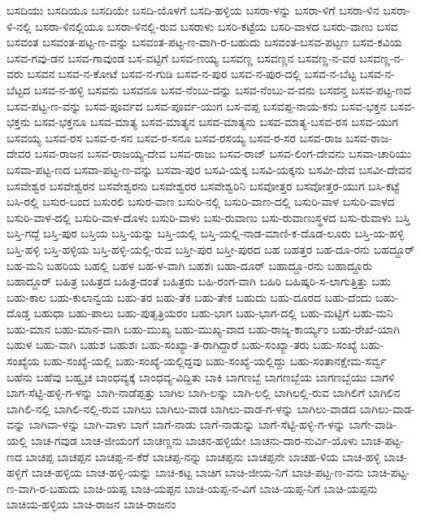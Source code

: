 ಬಸದಿಯು
ಬಸದಿಯೂ
ಬಸದಿಯೇ
ಬಸದಿ-ಯೊಳಗೆ
ಬಸದಿ-ಹಳ್ಳಿಯ
ಬಸರಾ-ಳನ್ನು
ಬಸರಾ-ಳಿಗೆ
ಬಸರಾ-ಳಿನ
ಬಸರಾ-ಳಿ-ನಲ್ಲಿ
ಬಸರಾ-ಳಿನಲ್ಲಿಯೂ
ಬಸರಾ-ಳಿನಲ್ಲಿ-ರುವ
ಬಸರಾಳು
ಬಸರಿ-ಕಟ್ಟೆಯ
ಬಸರಿ-ವಾಳದ
ಬಸರು-ವಾಣು
ಬಸವ
ಬಸವಂತ
ಬಸವಂತ-ಪಟ್ಟ-ಣ-ವನ್ನು
ಬಸವಂತ-ಪಟ್ಟ-ಣ-ವಾಗಿ-ರ-ಬಹುದು
ಬಸವಂತ-ಬಸವ-ಪಟ್ಟಣ
ಬಸವ-ಕವಿಯ
ಬಸವ-ಗವು-ಡನ
ಬಸವ-ಗಾವುಂಡ
ಬಸ-ವಟ್ಟಿಗೆ
ಬಸವ-ಣಯ್ಯ
ಬಸವಣ್ಣ
ಬಸವಣ್ಣನ
ಬಸವಣ್ಣ-ನ-ವರ
ಬಸವಣ್ಣ-ನ-ವರು
ಬಸವನ
ಬಸವ-ನ-ಕೋಟೆ
ಬಸವ-ನ-ಗುಡಿ
ಬಸವ-ನ-ಪುರ
ಬಸವ-ನ-ಪುರ-ದಲ್ಲಿ
ಬಸವ-ನ-ಬೆಟ್ಟ
ಬಸವ-ನ-ಬೆಟ್ಟದ
ಬಸವ-ನ-ಹಳ್ಳಿ
ಬಸವನು
ಬಸವನೂ
ಬಸವ-ನೆಂಬು-ದನ್ನು
ಬಸವ-ನೆಂಬು-ವ-ವನು
ಬಸವನ್ತ
ಬಸವ-ಪಟ್ಟ-ಣದ
ಬಸವ-ಪಟ್ಟ-ಣ-ವನ್ನು
ಬಸವ-ಪೂರ್ವದ
ಬಸವ-ಪೂರ್ವ-ಯುಗ
ಬಸ-ವಪ್ಪ
ಬಸವಪ್ಪ-ನಾಯ-ಕನು
ಬಸವ-ಭಕ್ತನ
ಬಸವ-ಭಕ್ತನು
ಬಸವ-ಭಕ್ತನೂ
ಬಸವ-ಮಾತ್ಯ
ಬಸವ-ಮಾತ್ಯನ
ಬಸವ-ಮಾತ್ಯನು
ಬಸವ-ಮಾತ್ಯ-ಬಸವ-ರಸ
ಬಸವ-ಯುಗ
ಬಸವಯ್ಯ
ಬಸವ-ರಸ
ಬಸವ-ರ-ಸನ
ಬಸವ-ರ-ಸನೂ
ಬಸವ-ರಸಯ್ಯ
ಬಸವ-ರ-ಸರ
ಬಸವ-ರಾಜ
ಬಸವ-ರಾಜ-ದೇವರ
ಬಸವ-ರಾಜನ
ಬಸವ-ರಾಜಯ್ಯ-ದೇವ
ಬಸವ-ರಾಜು
ಬಸವ-ರಾಜ್
ಬಸವ-ಲಿಂಗ-ದೇವನು
ಬಸವಾ-ಚಾರಿಯು
ಬಸವಾ-ಪಟ್ಟ-ಣದ
ಬಸವಾ-ಪಟ್ಟ-ಣ-ವನ್ನು
ಬಸವಾ-ಪುರ
ಬಸವಿ-ಯಕ್ಕ
ಬಸವಿ-ಯಕ್ಕನು
ಬಸವೀ-ದೇವ
ಬಸವೀ-ದೇವನ
ಬಸವೇಶ್ವರ
ಬಸವೇಶ್ವರನ
ಬಸವೇಶ್ವರನು
ಬಸವೇಶ್ವರರ
ಬಸವೇಶ್ವರಿನಿ
ಬಸವೋತ್ತರ
ಬಸವೋತ್ತರ-ಯುಗ
ಬಸಿ-ಕಟ್ಟೆ
ಬಸಿ-ರಲ್ಲಿ
ಬಸುರ-ಬಂದ
ಬಸುರಲಿ
ಬಸುರ-ವಾಣ
ಬಸುರಿ-ನಲ್ಲಿ
ಬಸುರಿ-ವಾಣ-ದಲ್ಲಿ
ಬಸುರಿ-ವಾಳ
ಬಸುರಿ-ವಾಳದ
ಬಸುರಿ-ವಾಳ-ದಲ್ಲಿ
ಬಸುರಿ-ವಾಳ-ದೊಳು
ಬಸುರಿ-ವಾಳು
ಬಸು-ರುವಾಣು
ಬಸು-ರುವಾಣುಸ್ಥಳದ
ಬಸು-ರುವಾಳು
ಬಸ್ತಿ
ಬಸ್ತಿ-ಗದ್ದೆ
ಬಸ್ತಿ-ಪುರ
ಬಸ್ತಿಯ
ಬಸ್ತಿ-ಯನ್ನು
ಬಸ್ತಿ-ಯಲ್ಲಿ
ಬಸ್ತಿ-ಯಲ್ಲಿ-ನಾಡ-ಮಾಣಿ-ಕ-ದೊಡ-ಲೂರು
ಬಸ್ತಿ-ಯ-ಹಳ್ಳಿ
ಬಸ್ತಿ-ಹಳ್ಳಿ
ಬಸ್ತಿ-ಹಳ್ಳಿಯ
ಬಸ್ತಿ-ಹಳ್ಳಿ-ಯಲ್ಲಿ-ರುವ
ಬಸ್ತೀ-ಪುರ
ಬಸ್ತೀ-ಪುರದ
ಬಹ
ಬಹತ್ತರ
ಬಹ-ದೂ-ರನು
ಬಹದ್ದೂರ್
ಬಹ-ಮನಿ
ಬಹರಿಯ
ಬಹಲ್ಲಿ
ಬಹಳ
ಬಹ-ಳ-ವಾಗಿ
ಬಹಶಃ
ಬಹಾ-ದೂರ್
ಬಹಾದ್ದೂ-ರನು
ಬಹಾದ್ದೂರು
ಬಹಾದ್ದೂರ್
ಬಹಿತ್ರ
ಬಹಿತ್ರದ
ಬಹಿತ್ರ-ದಂತೆ
ಬಹಿತ್ರರು
ಬಹಿ-ರಂಗ-ವಾಗಿ
ಬಹಿರಿ
ಬಹಿಷ್ಕರಿ-ಸ-ಲಾಗುತ್ತಿತ್ತು
ಬಹು
ಬಹು-ಕಾಲ
ಬಹು-ಕುಲಾನ್ವಯ
ಬಹು-ತರ
ಬಹು-ತೆಕ
ಬಹು-ತೇಕ
ಬಹುದು
ಬಹು-ದೂರದ
ಬಹು-ದೆಂದು
ಬಹು-ದೊಡ್ಡ
ಬಹುಧಾ
ಬಹು-ಪಾಲು
ಬಹು-ಪುತೃತ್ರಿಯರಂ
ಬಹು-ಭಾಗ
ಬಹು-ಭಾಗ-ದಲ್ಲಿ
ಬಹು-ಮಟ್ಟಿಗೆ
ಬಹು-ಮನಿ
ಬಹು-ಮಾನ
ಬಹು-ಮಾನ-ವಾಗಿ
ಬಹು-ಮುಖ್ಯ
ಬಹು-ಮುಖ್ಯ-ವಾದ
ಬಹು-ರಾಜ್ಯ-ಕಾರ್ಯ್ಯಂ
ಬಹು-ರೇಖೆ-ಯಾಗಿ
ಬಹುಳ
ಬಹು-ವಾಗಿ
ಬಹುಶ
ಬಹುಶಃ
ಬಹು-ಸಂಖ್ಯಾ-ತ-ರಾಗಿದ್ದಾರೆ
ಬಹು-ಸಂಖ್ಯಾ-ತರು
ಬಹು-ಸಂಖ್ಯೆ
ಬಹು-ಸಂಖ್ಯೆಯ
ಬಹು-ಸಂಖ್ಯೆ-ಯಲ್ಲಿ
ಬಹು-ಸಂಖ್ಯೆ-ಯಲ್ಲಿದ್ದವು
ಬಹು-ಸಂಖ್ಯೆ-ಯಲ್ಲಿದ್ದು
ಬಹು-ಸಂತಾನಕ್ಷೇಮ-ಸರ್ವ್ವ
ಬಹೆನು
ಬಹೆವು
ಬಹ್ವೃಚ
ಬಾಂಧವ್ಯಕ್ಕೆ
ಬಾಂಧವ್ಯ-ವಿದ್ದಿತು
ಬಾಕಿ
ಬಾಗಣಬ್ಬೆ
ಬಾಗಣಬ್ಬೆಯ
ಬಾಗಣಬ್ಬೆಯು
ಬಾಗಳಿ
ಬಾಗ-ಸೆಟ್ಟಿ-ಹಳ್ಳಿ-ಗ-ಳನ್ನು
ಬಾಗಿ-ನಾಡೆಪ್ಪತ್ತು
ಬಾಗಿಲ
ಬಾಗಿ-ಲನ್ನು
ಬಾಗಿ-ಲಲ್ಲಿ
ಬಾಗಿಲಲ್ಲಿ-ರುವ
ಬಾಗಿಲಿಗೆ
ಬಾಗಿಲಿನ
ಬಾಗಿಲಿ-ನಲ್ಲಿ
ಬಾಗಿಲಿ-ನಲ್ಲಿ-ರುವ
ಬಾಗಿಲು
ಬಾಗಿಲು-ವಾಡ
ಬಾಗಿಲು-ವಾಡ-ಗ-ಳನ್ನು
ಬಾಗಿಲು-ವಾಡದ
ಬಾಗಿಲು-ವಾಡ-ವನ್ನು
ಬಾಗಿವಾ-ಳನ್ನು
ಬಾಗಿ-ವಾಳು
ಬಾಗೆ
ಬಾಗೆ-ನಾಡು
ಬಾಗೆ-ನಾಡುನ್ನು
ಬಾಗೆ-ಸೆಟ್ಟಿ-ಹಳ್ಳಿ-ಗ-ಳನ್ನು
ಬಾಗೇ-ವಾಡಿ-ಯಲ್ಲಿ
ಬಾಚ-ಗವುಡ
ಬಾಚ-ಜೀಯಂಗೆ
ಬಾಚಣ್ಣನು
ಬಾಚನ-ಹಳ್ಳಿಯೇ
ಬಾಚನು-ದಾರ-ನುರ್ವಿ-ಯೊಳು
ಬಾಚ-ಪಟ್ಟ-ಣದ
ಬಾಚಪ್ಪ
ಬಾಚಪ್ಪನ
ಬಾಚಪ್ಪ-ನ-ಕೆರೆ
ಬಾಚಪ್ಪ-ನನ್ನು
ಬಾಚಪ್ಪನು
ಬಾಚಪ್ಪನೇ
ಬಾಚಹ-ಳಿಯ
ಬಾಚ-ಹಳ್ಳಿ
ಬಾಚ-ಹಳ್ಳಿಗೆ
ಬಾಚ-ಹಳ್ಳಿಯ
ಬಾಚ-ಹಳ್ಳಿ-ಯನ್ನು
ಬಾಚಿ-ಕಟ್ಟ
ಬಾಚಿಗ
ಬಾಚಿ-ಜೀಯ-ನಿಗೆ
ಬಾಚಿ-ಪಟ್ಟ-ಣ-ವನು
ಬಾಚಿ-ಪಟ್ಟ-ಣ-ವಾಗಿ-ರ-ಬಹುದು
ಬಾಚಿ-ಯಪ್ಪ
ಬಾಚಿ-ಯಪ್ಪನ
ಬಾಚಿ-ಯಪ್ಪ-ನ-ವಿಗೆ
ಬಾಚಿ-ಯಪ್ಪ-ನಿಗೆ
ಬಾಚಿ-ಯಪ್ಪನು
ಬಾಚಿಯ-ಹಳ್ಳಿಯ
ಬಾಚಿ-ರಾಜನ
ಬಾಚಿ-ರಾಜನಂ
